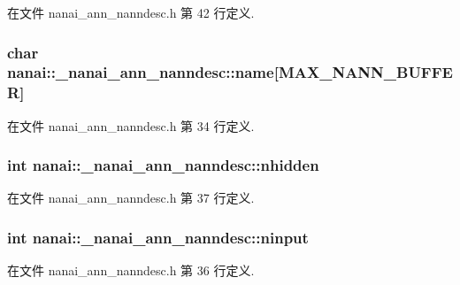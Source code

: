 在文件 nanai\+\_\+ann\+\_\+nanndesc.\+h 第 42 行定义.

\hypertarget{structnanai_1_1__nanai__ann__nanndesc_acb2c1033bc070b8e54407420cd55540d}{}
\subsubsection[{name}]{\setlength{\rightskip}{0pt plus 5cm}char nanai\+::\+\_\+nanai\+\_\+ann\+\_\+nanndesc\+::name\mbox{[}{\bf M\+A\+X\+\_\+\+N\+A\+N\+N\+\_\+\+B\+U\+F\+F\+E\+R}\mbox{]}}\label{structnanai_1_1__nanai__ann__nanndesc_acb2c1033bc070b8e54407420cd55540d}


在文件 nanai\+\_\+ann\+\_\+nanndesc.\+h 第 34 行定义.

\hypertarget{structnanai_1_1__nanai__ann__nanndesc_a3921a627a9ddf822036bcaed9d0bf1b5}{}
\subsubsection[{nhidden}]{\setlength{\rightskip}{0pt plus 5cm}int nanai\+::\+\_\+nanai\+\_\+ann\+\_\+nanndesc\+::nhidden}\label{structnanai_1_1__nanai__ann__nanndesc_a3921a627a9ddf822036bcaed9d0bf1b5}


在文件 nanai\+\_\+ann\+\_\+nanndesc.\+h 第 37 行定义.

\hypertarget{structnanai_1_1__nanai__ann__nanndesc_a71bf45651c89fa76315269228729d929}{}
\subsubsection[{ninput}]{\setlength{\rightskip}{0pt plus 5cm}int nanai\+::\+\_\+nanai\+\_\+ann\+\_\+nanndesc\+::ninput}\label{structnanai_1_1__nanai__ann__nanndesc_a71bf45651c89fa76315269228729d929}


在文件 nanai\+\_\+ann\+\_\+nanndesc.\+h 第 36 行定义.

\hypertarget{structnanai_1_1__nanai__ann__nanndesc_a62b3366bcb4042255717c4cfb6b604c4}{}
